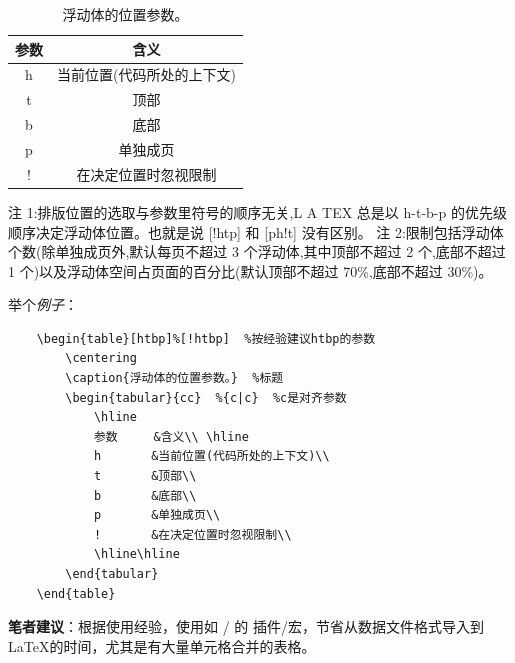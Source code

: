 \documentclass[11pt]{article}%
\newcommand{\vrb}[1]{\fcolorbox{green}{yellow}{#1}}
\begin{document}
\begin{table}[htbp]
    \centering
    \caption{浮动体的位置参数。}
    \begin{tabular}{cc}
        \hline
        \textbf{参数}     &\textbf{含义}\\ \hline
        h       &当前位置(代码所处的上下文)\\
        t       &顶部\\
        b       &底部\\
        p       &单独成页\\
        !       &在决定位置时忽视限制\\
        \hline\hline
    \end{tabular}
\end{table}

注 1:排版位置的选取与参数里符号的顺序无关,L A TEX 总是以 h-t-b-p 的优先级顺序决定浮动体位置。也就是说 [!htp] 和 [ph!t] 没有区别。
注 2:限制包括浮动体个数(除单独成页外,默认每页不超过 3 个浮动体,其中顶部不超过 2 个,底部不超过 1 个)以及浮动体空间占页面的百分比(默认顶部不超过 70\%,底部不超过 30\%)。

举个\emph{例子}：
\begin{verbatim}
    \begin{table}[htbp]%[!htbp]  %按经验建议htbp的参数
        \centering
        \caption{浮动体的位置参数。}  %标题
        \begin{tabular}{cc}  %{c|c}  %c是对齐参数
            \hline
            参数     &含义\\ \hline
            h       &当前位置(代码所处的上下文)\\
            t       &顶部\\
            b       &底部\\
            p       &单独成页\\
            !       &在决定位置时忽视限制\\
            \hline\hline
        \end{tabular}
    \end{table}
\end{verbatim}


\textbf{笔者建议}：根据使用经验，使用如  /  的 插件/宏，节省从数据文件格式导入到 \LaTeX 的时间，尤其是有大量单元格合并的表格。

\end{document}
